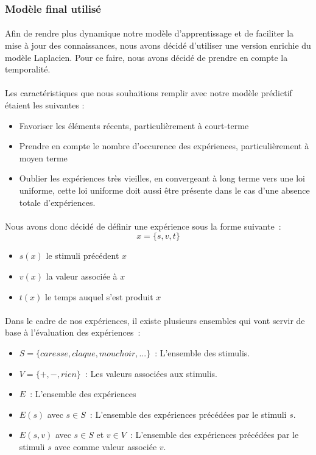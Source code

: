 \subsubsection{Modèle final utilisé}
\paragraph{}
Afin de rendre plus dynamique notre modèle d'apprentissage et de faciliter la
mise à jour des connaissances, nous avons décidé d'utiliser une version
enrichie du modèle Laplacien. Pour ce faire, nous avons décidé de prendre en
compte la temporalité. 

\paragraph{}
Les caractéristiques que nous souhaitions remplir avec notre modèle prédictif
étaient les suivantes :
\begin{itemize}
\item Favoriser les éléments récents, particulièrement à court-terme
\item Prendre en compte le nombre d'occurence des expériences,
      particulièrement à moyen terme
\item Oublier les expériences très vieilles, en convergeant à long terme vers
      une loi uniforme, cette loi uniforme doit aussi être présente dans le
      cas d'une absence totale d'expériences.
\end{itemize}

\paragraph{}
Nous avons donc décidé de définir une expérience sous
la forme suivante~:
$$x = \{s, v, t\}$$
\begin{itemize}
\item $s(x)$ le stimuli précédent $x$
\item $v(x)$ la valeur associée à $x$
\item $t(x)$ le temps auquel s'est produit $x$
\end{itemize}

\paragraph{}
Dans le cadre de nos expériences, il existe plusieurs ensembles qui vont
servir de base à l'évaluation des expériences~:
\begin{itemize}
\item $S=\{caresse, claque, mouchoir, ...\}$~: L'ensemble des stimulis.
\item $V=\{+,-,rien\}$~: Les valeurs associées aux stimulis.
\item $E$~: L'ensemble des expériences
\item $E(s)$ avec $s \in S$~: L'ensemble des expériences précédées par le
      stimuli $s$.
\item $E(s,v)$ avec $s \in S$ et $v \in V$~: L'ensemble des expériences
      précédées par le stimuli $s$ avec comme valeur associée $v$.
\end{itemize}

